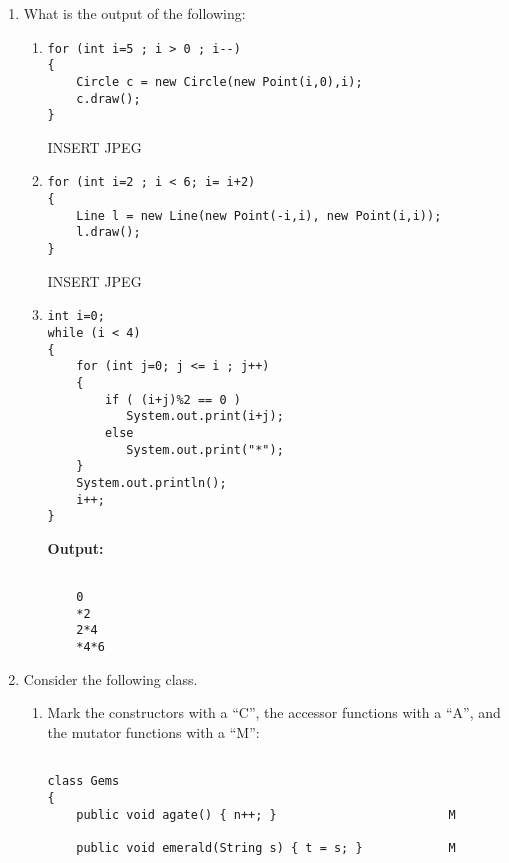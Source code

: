 \begin{enumerate}
\begin{enumerate}
	    \item \underline{F} The output of {\tt mystery(1234)}
is {\tt 4321}.
\begin{verbatim}    public void mystery(int n)
    {   if ( n < 10 ) System.out.print(n);
        else {   mystery(n/10); System.out.print(n%10); } }
\end{verbatim}
\end{enumerate}


    \item What is the output of the following:
	\begin{enumerate}
	    \item
\begin{verbatim}
for (int i=5 ; i > 0 ; i--)
{
    Circle c = new Circle(new Point(i,0),i);
    c.draw();
}
\end{verbatim}

INSERT JPEG

	    \item
\begin{verbatim}
for (int i=2 ; i < 6; i= i+2)
{
    Line l = new Line(new Point(-i,i), new Point(i,i));
    l.draw();
}
\end{verbatim}

INSERT JPEG

	    \item
\begin{verbatim}
int i=0; 
while (i < 4)
{
    for (int j=0; j <= i ; j++)
    {
        if ( (i+j)%2 == 0 )
           System.out.print(i+j);
        else
           System.out.print("*");
    } 
    System.out.println();
    i++;
}
\end{verbatim}
        {\bf Output:}
\begin{verbatim}

    0
    *2
    2*4
    *4*6
\end{verbatim}
	\end{enumerate}

    \item Consider the following class.  
	\begin{enumerate}
	    \item Mark the constructors
		with a ``C'', the accessor functions with a ``A'',
		and the mutator functions with a ``M'':
\begin{verbatim}

class Gems
{
    public void agate() { n++; }                        M

    public void emerald(String s) { t = s; }            M
    

\end{verbatim}
\end{enumerate}
\end{enumerate}
